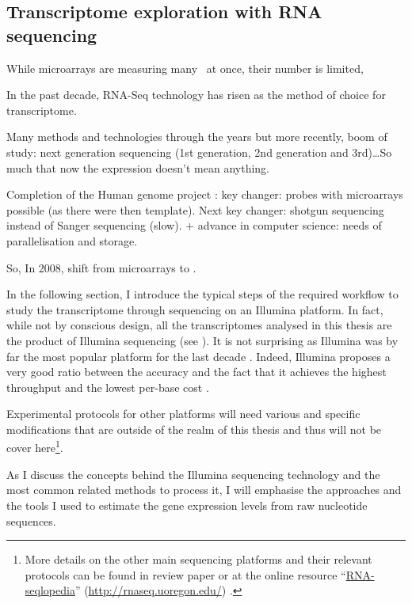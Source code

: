 \subsection{Transcriptome exploration with RNA sequencing}

While microarrays are measuring many \mRNAs\ at once, their number is limited,

In the past decade, \gls{RNA-Seq} technology has risen as the method of choice
for  transcriptome.

Many methods and technologies through the years but more recently, boom of study:
next generation sequencing (1st generation, 2nd generation and 3rd)\ldots So
much that now the expression doesn't mean anything.

Completion of the Human genome project : key changer: probes with microarrays
possible (as there were then template). Next key changer: shotgun sequencing
instead of Sanger sequencing (slow). + advance in computer science: needs of
parallelisation and storage.

So, In 2008, shift from microarrays to \Rnaseq.

\clearpage

In the following section, I introduce the typical steps of the required workflow
to study the transcriptome through sequencing on an Illumina platform. In fact,
while not by conscious design, all the transcriptomes analysed in this thesis are
the product of Illumina sequencing (see
).
It is not surprising as Illumina was by far
the most popular platform for the last decade .
Indeed, Illumina proposes a very
good ratio between the accuracy and the fact that it achieves the highest
throughput and the lowest per-base cost .

Experimental protocols for other platforms will need various and specific
modifications that are outside of the realm of this thesis and thus will not be
cover here\footnote{More details on the other main sequencing platforms and their
relevant protocols can be found in \cite{rnaseqProtocols} review paper or at the
online resource ``\href{http://rnaseq.uoregon.edu/}{RNA-seqlopedia}''
(\href{http://rnaseq.uoregon.edu/}{http://rnaseq.uoregon.edu/})
.}.

As I discuss the concepts behind the Illumina sequencing technology and the
most common related methods to process it, I will emphasise the approaches and
the tools I used to estimate the gene expression levels from raw nucleotide
sequences.

